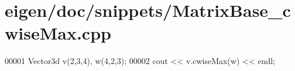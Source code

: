 \hypertarget{eigen_2doc_2snippets_2_matrix_base__cwise_max_8cpp_source}{}\section{eigen/doc/snippets/\+Matrix\+Base\+\_\+cwise\+Max.cpp}
\label{eigen_2doc_2snippets_2_matrix_base__cwise_max_8cpp_source}

\begin{DoxyCode}
00001 Vector3d v(2,3,4), w(4,2,3);
00002 cout << v.cwiseMax(w) << endl;
\end{DoxyCode}
